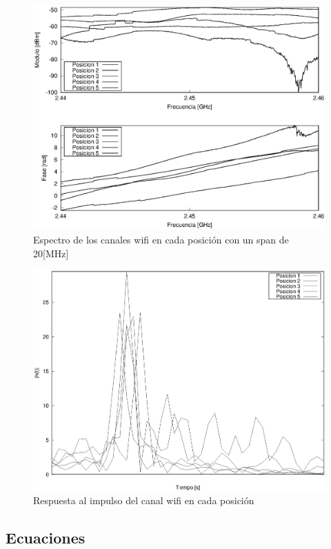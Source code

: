 \documentclass[10pt,conference,a4paper]{IEEEtran}
\begin{document}
\begin{figure}[htb]
    \centering
    \includegraphics[width=\columnwidth]{figuras/funcion_transferencia_canal_wifi.eps}
    \caption{Espectro de los canales wifi en cada posición con un span de 20[MHz]}
    \label{fig:transferencia_canal_wifi}
\end{figure}
\begin{figure}[htb]
    \centering
    \includegraphics[width=\columnwidth]{figuras/respuesta_impulso_wifi.eps}
    \caption{Respuesta al impulso del canal wifi en cada posición}
    \label{fig:impulso_wifi}
\end{figure}
\subsection{Ecuaciones}
\end{document}
